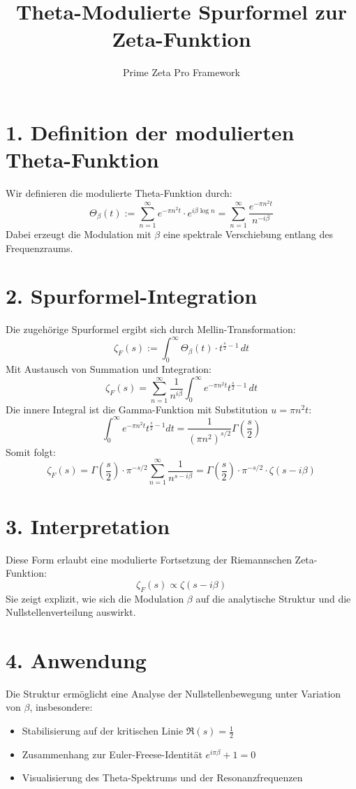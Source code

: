 \documentclass{article}
\title{Theta-Modulierte Spurformel zur Zeta-Funktion}
\author{Prime Zeta Pro Framework}
\date{}
\begin{document}
\maketitle

\section*{1. Definition der modulierten Theta-Funktion}
Wir definieren die modulierte Theta-Funktion durch:
\[
\Theta_\beta(t) := \sum_{n=1}^{\infty} e^{-\pi n^2 t} \cdot e^{i \beta \log n} = \sum_{n=1}^{\infty} \frac{e^{-\pi n^2 t}}{n^{-i\beta}}
\]
Dabei erzeugt die Modulation mit \(\beta\) eine spektrale Verschiebung entlang des Frequenzraums.

\section*{2. Spurformel-Integration}
Die zugehörige Spurformel ergibt sich durch Mellin-Transformation:
\[
\zeta_F(s) := \int_0^\infty \Theta_\beta(t) \cdot t^{\frac{s}{2} - 1} \, dt
\]
Mit Austausch von Summation und Integration:
\[
\zeta_F(s) = \sum_{n=1}^{\infty} \frac{1}{n^{i\beta}} \int_0^\infty e^{-\pi n^2 t} t^{\frac{s}{2} - 1} \, dt
\]
Die innere Integral ist die Gamma-Funktion mit Substitution \(u = \pi n^2 t\):
\[
\int_0^\infty e^{-\pi n^2 t} t^{\frac{s}{2} - 1} dt = \frac{1}{(\pi n^2)^{s/2}} \Gamma\left( \frac{s}{2} \right)
\]
Somit folgt:
\[
\zeta_F(s) = \Gamma\left( \frac{s}{2} \right) \cdot \pi^{-s/2} \sum_{n=1}^{\infty} \frac{1}{n^{s - i\beta}} = \Gamma\left( \frac{s}{2} \right) \cdot \pi^{-s/2} \cdot \zeta(s - i\beta)
\]

\section*{3. Interpretation}
Diese Form erlaubt eine modulierte Fortsetzung der Riemannschen Zeta-Funktion:
\[
\zeta_F(s) \propto \zeta(s - i\beta)
\]
Sie zeigt explizit, wie sich die Modulation \(\beta\) auf die analytische Struktur und die Nullstellenverteilung auswirkt.

\section*{4. Anwendung}
Die Struktur ermöglicht eine Analyse der Nullstellenbewegung unter Variation von \(\beta\), insbesondere:
\begin{itemize}
  \item Stabilisierung auf der kritischen Linie \(\Re(s) = \frac{1}{2}\)
  \item Zusammenhang zur Euler-Freese-Identität \(e^{i \pi \beta} + 1 = 0\)
  \item Visualisierung des Theta-Spektrums und der Resonanzfrequenzen
\end{itemize}
\end{document}
